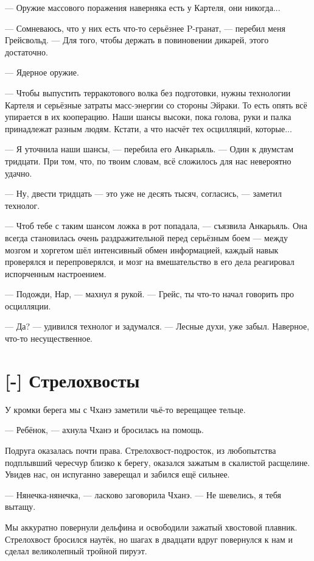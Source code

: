 --- Оружие массового поражения наверняка есть у Картеля, они никогда...

--- Сомневаюсь, что у них есть что-то серьёзнее P-гранат, --- перебил меня Грейсвольд.
--- Для того, чтобы держать в повиновении дикарей, этого достаточно.

--- Ядерное оружие.

--- Чтобы выпустить терракотового волка без подготовки, нужны технологии Картеля и серьёзные затраты масс-энергии со стороны Эйраки.
То есть опять всё упирается в их кооперацию.
Наши шансы высоки, пока голова, руки и палка принадлежат разным людям.
Кстати, а что насчёт тех осцилляций, которые...

--- Я уточнила наши шансы, --- перебила его Анкарьяль.
--- Один к двумстам тридцати.
При том, что, по твоим словам, всё сложилось для нас невероятно удачно.

--- Ну, двести тридцать --- это уже не десять тысяч, согласись, --- заметил технолог.

--- Чтоб тебе с таким шансом ложка в рот попадала, --- съязвила Анкарьяль.
Она всегда становилась очень раздражительной перед серьёзным боем --- между мозгом и хоргетом шёл интенсивный обмен информацией, каждый навык проверялся и перепроверялся, и мозг на вмешательство в его дела реагировал испорченным настроением.

--- Подожди, Нар, --- махнул я рукой.
--- Грейс, ты что-то начал говорить про осцилляции.

--- Да? --- удивился технолог и задумался.
--- Лесные духи, уже забыл.
Наверное, что-то несущественное.

\section{[-] Стрелохвосты}

У кромки берега мы с Чханэ заметили чьё-то верещащее тельце.

--- Ребёнок, --- ахнула Чханэ и бросилась на помощь.

Подруга оказалась почти права.
Стрелохвост-подросток, из любопытства подплывший чересчур близко к берегу, оказался зажатым в скалистой расщелине.
Увидев нас, он испуганно заверещал и забился ещё сильнее.

--- Нянечка-нянечка, --- ласково заговорила Чханэ.
--- Не шевелись, я тебя вытащу.

Мы аккуратно повернули дельфина и освободили зажатый хвостовой плавник.
Стрелохвост бросился наутёк, но шагах в двадцати вдруг повернулся к нам и сделал великолепный тройной пируэт.

